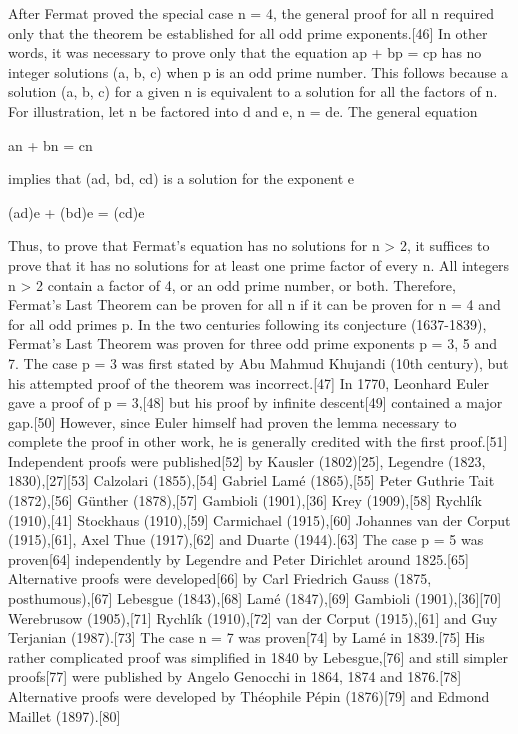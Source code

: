 \documentclass[12pt, a4paper, twoside]{article}
\numberwithin{equation}{section}
\begin{document}
After Fermat proved the special case n = 4, the general proof for all n required only that the theorem be established for all odd prime exponents.[46] In other words, it was necessary to prove only that the equation ap + bp = cp has no integer solutions (a, b, c) when p is an odd prime number. This follows because a solution (a, b, c) for a given n is equivalent to a solution for all the factors of n. For illustration, let n be factored into d and e, n = de. The general equation

    an + bn = cn

implies that (ad, bd, cd) is a solution for the exponent e

    (ad)e + (bd)e = (cd)e

Thus, to prove that Fermat's equation has no solutions for n > 2, it suffices to prove that it has no solutions for at least one prime factor of every n. All integers n > 2 contain a factor of 4, or an odd prime number, or both. Therefore, Fermat's Last Theorem can be proven for all n if it can be proven for n = 4 and for all odd primes p.
In the two centuries following its conjecture (1637-1839), Fermat's Last Theorem was proven for three odd prime exponents p = 3, 5 and 7. The case p = 3 was first stated by Abu Mahmud Khujandi (10th century), but his attempted proof of the theorem was incorrect.[47] In 1770, Leonhard Euler gave a proof of p = 3,[48] but his proof by infinite descent[49] contained a major gap.[50] However, since Euler himself had proven the lemma necessary to complete the proof in other work, he is generally credited with the first proof.[51] Independent proofs were published[52] by Kausler (1802)[25], Legendre (1823, 1830),[27][53] Calzolari (1855),[54] Gabriel Lamé (1865),[55] Peter Guthrie Tait (1872),[56] Günther (1878),[57] Gambioli (1901),[36] Krey (1909),[58] Rychlík (1910),[41] Stockhaus (1910),[59] Carmichael (1915),[60] Johannes van der Corput (1915),[61], Axel Thue (1917),[62] and Duarte (1944).[63] The case p = 5 was proven[64] independently by Legendre and Peter Dirichlet around 1825.[65] Alternative proofs were developed[66] by Carl Friedrich Gauss (1875, posthumous),[67] Lebesgue (1843),[68] Lamé (1847),[69] Gambioli (1901),[36][70] Werebrusow (1905),[71] Rychlík (1910),[72] van der Corput (1915),[61] and Guy Terjanian (1987).[73] The case n = 7 was proven[74] by Lamé in 1839.[75] His rather complicated proof was simplified in 1840 by Lebesgue,[76] and still simpler proofs[77] were published by Angelo Genocchi in 1864, 1874 and 1876.[78] Alternative proofs were developed by Théophile Pépin (1876)[79] and Edmond Maillet (1897).[80]
\end{document}
